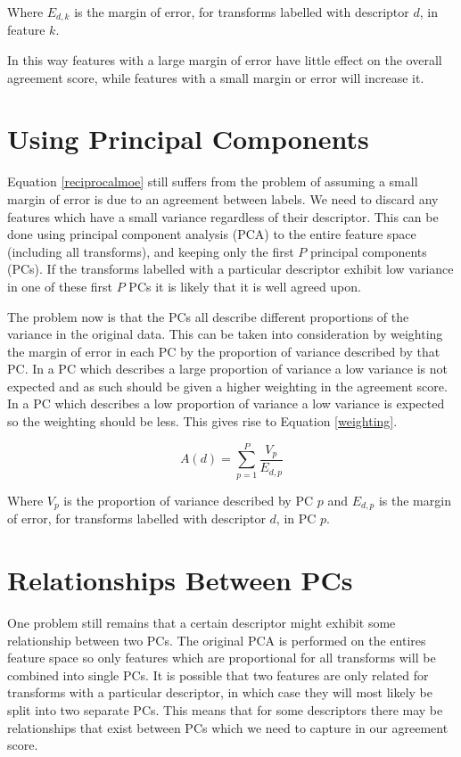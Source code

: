 \documentclass[a4paper]{article}
\begin{document}
Where $E_{d,k}$ is the margin of error, for transforms labelled with descriptor $d$, in feature $k$.

In this way features with a large margin of error have little effect on the overall agreement score, while features with a
small margin or error will increase it.

\section*{Using Principal Components}
Equation \ref{reciprocalmoe} still suffers from the problem of assuming a small margin of error is due to an agreement
between labels. We need to discard any features which have a small variance regardless of their descriptor. This can be done
using principal component analysis (PCA) to the entire feature space (including all transforms), and keeping only the first
$P$ principal components (PCs). If the transforms labelled with a particular descriptor exhibit low variance in one of these
first $P$ PCs it is likely that it is well agreed upon.

The problem now is that the PCs all describe different proportions of the variance in the original data.  This can be taken
into consideration by weighting the margin of error in each PC by the proportion of variance described by that PC. In a PC
which describes a large proportion of variance a low variance is not expected and as such should be given a higher weighting
in the agreement score. In a PC which describes a low proportion of variance a low variance is expected so the weighting
should be less. This gives rise to Equation \ref{weighting}.

	\begin{equation}
		A(d) = \sum_{p=1}^{P} \frac{V_{p}}{E_{d,p}}
		\label{weighting}
	\end{equation}

Where $V_{p}$ is the proportion of variance described by PC $p$ and $E_{d,p}$ is the margin of error, for transforms
labelled with descriptor $d$, in PC $p$.

\section*{Relationships Between PCs}
One problem still remains that a certain descriptor might exhibit some relationship between two PCs. The original PCA is
performed on the entires feature space so only features which are proportional for all transforms will be combined into
single PCs. It is possible that two features are only related for transforms with a particular descriptor, in which case
they will most likely be split into two separate PCs. This means that for some descriptors there may be relationships that
exist between PCs which we need to capture in our agreement score.
\end{document}
